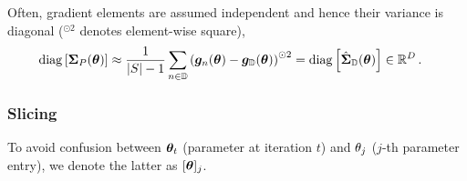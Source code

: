 Often, gradient elements are assumed independent and hence their variance is
diagonal ($^{\odot 2}$ denotes element-wise square),
\begin{align}
  \label{cockpit::eq:cheat-sheet-risk-gradient-diagonal-variance-estimator}
  \operatorname{diag}\left[{\bm{\Sigma}}_P({\bm{\theta}})\right]
  &\approx \frac{1}{|S| - 1} \sum_{n\in{\mathbb{D}}}
    \left(
    {\bm{g}}_n({\bm{\theta}}) - {\bm{g}}_{{\mathbb{D}}}({\bm{\theta}})
    \right)^{\odot 2}
    = \operatorname{diag}\left[\hat{{\bm{\Sigma}}}_{\mathbb{D}}({\bm{\theta}})\right] \in {\mathbb{R}}^D\,.
\end{align}

\subsubsection{Slicing}

To avoid confusion between ${\bm{\theta}}_t$ (parameter at iteration $t$) and
${\theta}_j$ ($j$-th parameter entry), we denote the latter as $[{\bm{\theta}}]_j$.

